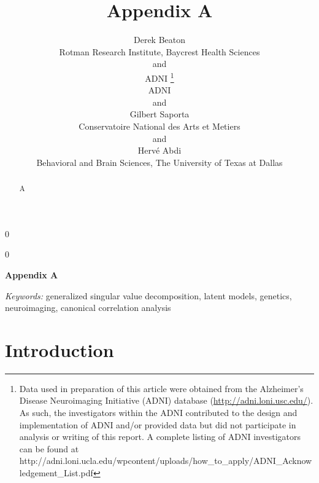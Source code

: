 \documentclass[12pt]{article}
\newcommand{\blind}{0}
\begin{document}
\def\spacingset#1{\renewcommand{\baselinestretch}%
{#1}\small\normalsize} \spacingset{1}



\blind
{
  \title{\bf Appendix A}

  \author{
        Derek Beaton \\
    Rotman Research Institute, Baycrest Health Sciences\\
     and \\     ADNI \thanks{Data used in preparation of this article were obtained from the
Alzheimer's Disease Neuroimaging Initiative (ADNI) database
(\url{http://adni.loni.usc.edu/}). As such, the investigators within the
ADNI contributed to the design and implementation of ADNI and/or
provided data but did not participate in analysis or writing of this
report. A complete listing of ADNI investigators can be found at
http://adni.loni.ucla.edu/wpcontent/uploads/how\_to\_apply/ADNI\_Acknowledgement\_List.pdf} \\
    ADNI\\
     and \\     Gilbert Saporta \\
    Conservatoire National des Arts et Metiers\\
     and \\     Hervé Abdi \\
    Behavioral and Brain Sciences, The University of Texas at Dallas\\
      }
  \maketitle
} \fi

\blind
{
  \bigskip
  \bigskip
  \bigskip
  \begin{center}
    {\LARGE\bf Appendix A}
  \end{center}
  \medskip
} \fi

\bigskip
\begin{abstract}
A
\end{abstract}

\noindent%
{\it Keywords:} generalized singular value decomposition, latent models, genetics, neuroimaging, canonical correlation analysis
\vfill

\newpage
\spacingset{1.45} %

\hypertarget{introduction}{%
\section{Introduction}\label{introduction}}
\end{document}
